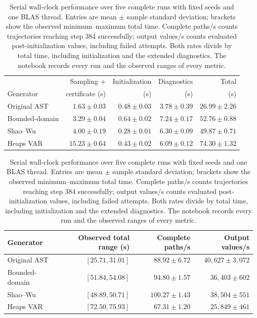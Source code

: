 \begin{table}[H]
\centering\small
\setlength{\tabcolsep}{5pt}
\begin{tabular}{@{}lrrrr@{}}
\toprule
& Sampling + & Initialization & Diagnostics & Total \\
Generator & certificate (s) & (s) & (s) & (s) \\
\midrule
Original AST & $1.63\pm0.03$ & $0.48\pm0.03$ & $3.78\pm0.39$ & $26.99\pm2.26$ \\
Bounded-domain & $3.29\pm0.04$ & $0.64\pm0.02$ & $7.24\pm0.17$ & $52.76\pm0.88$ \\
Shao--Wu & $4.00\pm0.19$ & $0.28\pm0.01$ & $6.30\pm0.09$ & $49.87\pm0.71$ \\
Heaps VAR & $15.23\pm0.64$ & $0.43\pm0.02$ & $6.09\pm0.12$ & $74.30\pm1.32$ \\
\bottomrule
\end{tabular}
\par\medskip
\begin{tabular}{@{}lrrr@{}}
\toprule
Generator & Observed total range (s) & Complete paths/s & Output values/s \\
\midrule
Original AST & $[25.71,31.01]$ & $88.92\pm6.72$ & $40{,}627\pm3{,}072$ \\
Bounded-domain & $[51.84,54.08]$ & $94.80\pm1.57$ & $36{,}403\pm602$ \\
Shao--Wu & $[48.89,50.71]$ & $100.27\pm1.43$ & $38{,}504\pm551$ \\
Heaps VAR & $[72.50,75.93]$ & $67.31\pm1.20$ & $25{,}849\pm461$ \\
\bottomrule
\end{tabular}
\caption{Serial wall-clock performance over five complete runs with fixed
seeds and one BLAS thread. Entries are mean $\pm$ sample standard deviation;
brackets show the observed minimum--maximum total time. Complete paths/s
counts trajectories reaching step 384 successfully; output values/s counts
evaluated post-initialization values, including failed attempts. Both rates
divide by total time, including initialization and the extended diagnostics.
The notebook records every run and the observed ranges of every metric.}
\label{tab:generator-speed}
\end{table}

